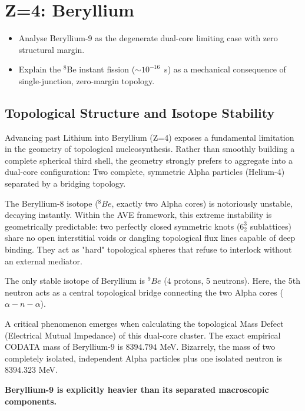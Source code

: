 \chapter{Z=4: Beryllium}
\label{ch:beryllium}


\begin{objectivebox}
\begin{itemize}
    \item Analyse Beryllium-9 as the degenerate dual-core limiting case with zero structural margin.
    \item Explain the $^8$Be instant fission ($\sim 10^{-16}$~s) as a mechanical consequence of single-junction, zero-margin topology.
\end{itemize}
\end{objectivebox}

\section{Topological Structure and Isotope Stability}
Advancing past Lithium into Beryllium (Z=4) exposes a fundamental limitation in the geometry of topological nucleosynthesis. Rather than smoothly building a complete spherical third shell, the geometry strongly prefers to aggregate into a dual-core configuration: Two complete, symmetric Alpha particles (Helium-4) separated by a bridging topology.

The Beryllium-8 isotope ($^8Be$, exactly two Alpha cores) is notoriously unstable, decaying instantly. Within the AVE framework, this extreme instability is geometrically predictable: two perfectly closed symmetric knots ($6^3_2$ sublattices) share no open interstitial voids or dangling topological flux lines capable of deep binding. They act as "hard" topological spheres that refuse to interlock without an external mediator.

The only stable isotope of Beryllium is $^9Be$ (4 protons, 5 neutrons). Here, the 5th neutron acts as a central topological bridge connecting the two Alpha cores ($\alpha - n - \alpha$). 

A critical phenomenon emerges when calculating the topological Mass Defect (Electrical Mutual Impedance) of this dual-core cluster. The exact empirical CODATA mass of Beryllium-9 is $8394.794$ MeV. Bizarrely, the mass of two completely isolated, independent Alpha particles plus one isolated neutron is $8394.323$ MeV. 

\textbf{Beryllium-9 is explicitly heavier than its separated macroscopic components.}

